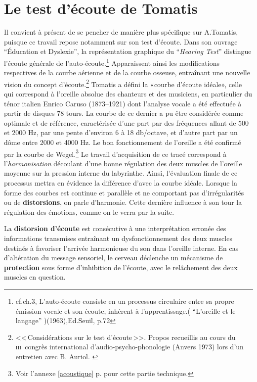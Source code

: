 
\section{Le test d'écoute de Tomatis}

Il convient à présent de se pencher de manière plus spécifique sur
A.Tomatis, puisque ce travail repose notamment sur son test d'écoute.
Dans son ouvrage ``Éducation et
    Dyslexie''\autocite{tomatis:education}, la représentation graphique du 
 ``\emph{Hearing Test}'' distingue l'écoute générale de
 l'auto-écoute.\footnote{cf.ch.3, L'auto-écoute consiste en un processus
   circulaire entre sa propre  émission vocale et son écoute, inhérent
   à l'apprentissage.( ``L'oreille et le langage'' )(1963),Ed.Seuil,
   p.72}
 Apparaissent ainsi les modifications respectives
 de la courbe aérienne et de la courbe osseuse, entraînant une nouvelle vision
 du concept d'écoute.\footnote{<<\,Considérations sur le test d'écoute\,>>. Propos
  	recueillis au cours du \textsc{iii}\ieme\ congrès international
  	d'audio-psycho-phonologie (Anvers 1973) lors d'un entretien
        avec B. Auriol. \autocite{auriol_stress}}
Tomatis a défini la «courbe d'écoute idéale», celle qui correspond à l'oreille absolue
des chanteurs et des musiciens, en particulier du ténor italien Enrico
Caruso (1873--1921) dont l'analyse vocale a été effectuée à partir de
disques 78 tours. La courbe de ce dernier a pu être considérée comme
optimale et de référence, caractérisée d'une part par des fréquences allant de 500 et 2000
Hz, par une pente d\textquoteright environ 6 à 18 db/octave,
et d'autre part par un dôme entre 2000 et 4000 Hz.
Le bon fonctionnement de l'oreille a été confirmé par la courbe
de Wegel.\footnote{
		Voir l'annexe \ref{acoustique} p. \pageref{acoustique}
		 pour cette partie technique.}
               Le travail d'acquisition de ce tracé correspond à l'\textsl{harmonisation}
découlant d'une bonne régulation des deux muscles de l'oreille moyenne
sur la pression interne du
labyrinthe.
Ainsi, l'évaluation finale de ce processus mettra en évidence la différence
d'avec la courbe idéale.
Lorsque la forme des 
courbes est continue et parallèle et ne comportant pas d'irrégularités ou
de \textbf{distorsions},
on parle d'harmonie.
Cette dernière influence à son tour 
la régulation des émotions, comme on le verra par la suite.



La \textbf{distorsion d'écoute} est consécutive à une interprétation
erronée des informations transmises entraînant un dysfonctionnement
des deux muscles destinés à favoriser l'arrivée
harmonieuse du son dans l'oreille interne.
En cas d'altération du message sensoriel,
le cerveau déclenche un mécanisme de\textbf{ protection} sous forme
d'inhibition de l'écoute, avec le relâchement des deux muscles en
question.


